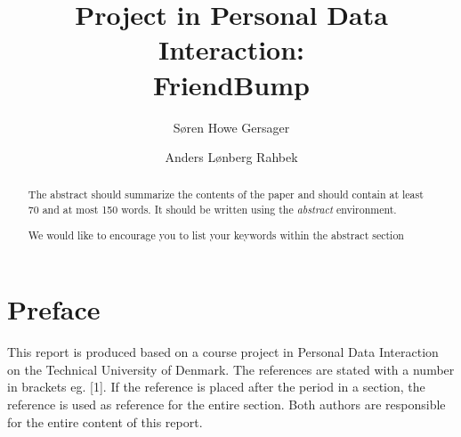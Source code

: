 \documentclass[runningheads,a4paper]{llncs}
\newcommand{\keywords}[1]{\par\addvspace\baselineskip
\noindent\keywordname\enspace\ignorespaces#1}
\begin{document}
\mainmatter  %

\title{Project in Personal Data Interaction:\\FriendBump}


%
%
\author{S\o ren Howe Gersager \and Anders L\o nberg Rahbek}
%


%
%

\maketitle


\begin{abstract}
The abstract should summarize the contents of the paper and should
contain at least 70 and at most 150 words. It should be written using the
\emph{abstract} environment.
\keywords{We would like to encourage you to list your keywords within
the abstract section}
\end{abstract}


\section*{Preface}
This report is produced based on a course project in Personal Data Interaction on the Technical University of Denmark. The references are stated with a number in brackets eg. [1]. If the reference is placed after the period in a section, the reference is used as reference for the entire section. 
Both authors are responsible for the entire content of this report.
\end{document}
